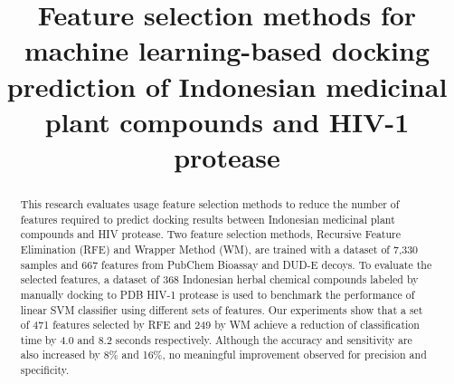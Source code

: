 \documentclass[conference]{IEEEtran}
\begin{document}
\title{Feature selection methods for machine learning-based docking prediction of Indonesian medicinal plant compounds and HIV-1 protease}



%
%	
%	

\maketitle

\begin{abstract}
	
	This research evaluates usage feature selection methods to reduce the number of features required to predict docking results between Indonesian medicinal plant compounds and HIV protease. Two feature selection methods, Recursive Feature Elimination (RFE) and Wrapper Method (WM), are trained with a dataset of 7,330 samples and 667 features from PubChem Bioassay and DUD-E decoys. To evaluate the selected features, a dataset of 368 Indonesian herbal chemical compounds labeled by manually docking to PDB HIV-1 protease is used to benchmark the performance of linear SVM classifier using different sets of features. Our experiments show that a set of 471 features selected by RFE and 249 by WM achieve a reduction of classification time by 4.0 and 8.2 seconds respectively. Although the accuracy and sensitivity are also increased by 8\% and 16\%, no meaningful improvement observed for precision and specificity.  
	
\end{abstract}
\end{document}
